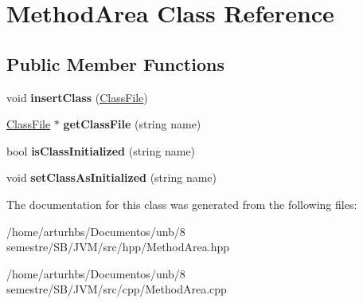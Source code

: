 \hypertarget{classMethodArea}{}\section{Method\+Area Class Reference}
\label{classMethodArea}
\subsection*{Public Member Functions}
\begin{DoxyCompactItemize}
\item 
void {\bfseries insert\+Class} (\hyperlink{classClassFile}{Class\+File})\hypertarget{classMethodArea_acbed0fac7a8faddb9db077d2db371975}{}\label{classMethodArea_acbed0fac7a8faddb9db077d2db371975}

\item 
\hyperlink{classClassFile}{Class\+File} $\ast$ {\bfseries get\+Class\+File} (string name)\hypertarget{classMethodArea_adb24ecb911e16d944bcc6f08c8b6d456}{}\label{classMethodArea_adb24ecb911e16d944bcc6f08c8b6d456}

\item 
bool {\bfseries is\+Class\+Initialized} (string name)\hypertarget{classMethodArea_a87c8ddc94c3e15227978b83bfa30aa13}{}\label{classMethodArea_a87c8ddc94c3e15227978b83bfa30aa13}

\item 
void {\bfseries set\+Class\+As\+Initialized} (string name)\hypertarget{classMethodArea_a983834bb0ba6196b094ef91e0843da16}{}\label{classMethodArea_a983834bb0ba6196b094ef91e0843da16}

\end{DoxyCompactItemize}


The documentation for this class was generated from the following files\+:\begin{DoxyCompactItemize}
\item 
/home/arturhbs/\+Documentos/unb/8 semestre/\+S\+B/\+J\+V\+M/src/hpp/Method\+Area.\+hpp\item 
/home/arturhbs/\+Documentos/unb/8 semestre/\+S\+B/\+J\+V\+M/src/cpp/Method\+Area.\+cpp\end{DoxyCompactItemize}
